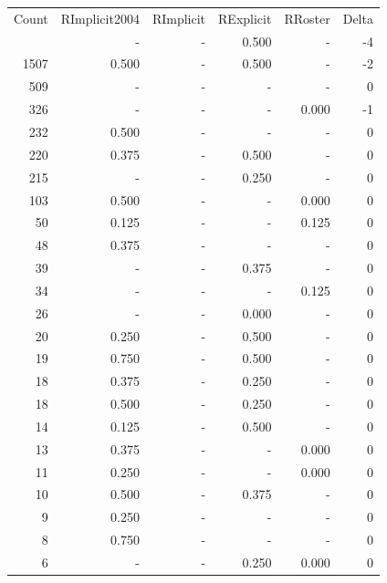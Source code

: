 \documentclass[a4paper]{article}\usepackage{graphicx, color}
\begin{document}
\begin{table}[ht]
\centering
\begin{tabular}{rrrrrr}
  \hline
Count & RImplicit2004 & RImplicit & RExplicit & RRoster & Delta \\ 
  \rowcolor{sosoColor}  \hline
1793 & - & - & 0.500 & - & -4 \\ 
   \rowcolor{sosoColor} 1507 & 0.500 & - & 0.500 & - & -2 \\ 
   \rowcolor{nullColor} 509 & - & - & - & - & 0 \\ 
   \rowcolor{nullColor} 326 & - & - & - & 0.000 & -1 \\ 
   \rowcolor{nullColor} 232 & 0.500 & - & - & - & 0 \\ 
   \rowcolor{sosoColor} 220 & 0.375 & - & 0.500 & - & 0 \\ 
   \rowcolor{sosoColor} 215 & - & - & 0.250 & - & 0 \\ 
   \rowcolor{nullColor} 103 & 0.500 & - & - & 0.000 & 0 \\ 
   \rowcolor{nullColor} 50 & 0.125 & - & - & 0.125 & 0 \\ 
   \rowcolor{nullColor} 48 & 0.375 & - & - & - & 0 \\ 
   \rowcolor{sosoColor} 39 & - & - & 0.375 & - & 0 \\ 
   \rowcolor{nullColor} 34 & - & - & - & 0.125 & 0 \\ 
   \rowcolor{sosoColor} 26 & - & - & 0.000 & - & 0 \\ 
   \rowcolor{sosoColor} 20 & 0.250 & - & 0.500 & - & 0 \\ 
   \rowcolor{sosoColor} 19 & 0.750 & - & 0.500 & - & 0 \\ 
   \rowcolor{sosoColor} 18 & 0.375 & - & 0.250 & - & 0 \\ 
   \rowcolor{sosoColor} 18 & 0.500 & - & 0.250 & - & 0 \\ 
   \rowcolor{sosoColor} 14 & 0.125 & - & 0.500 & - & 0 \\ 
   \rowcolor{nullColor} 13 & 0.375 & - & - & 0.000 & 0 \\ 
   \rowcolor{nullColor} 11 & 0.250 & - & - & 0.000 & 0 \\ 
   \rowcolor{sosoColor} 10 & 0.500 & - & 0.375 & - & 0 \\ 
   \rowcolor{nullColor} 9 & 0.250 & - & - & - & 0 \\ 
   \rowcolor{nullColor} 8 & 0.750 & - & - & - & 0 \\ 
   \rowcolor{sosoColor} 6 & - & - & 0.250 & 0.000 & 0 \\ 

\end{tabular}
\end{table}
\end{document}
